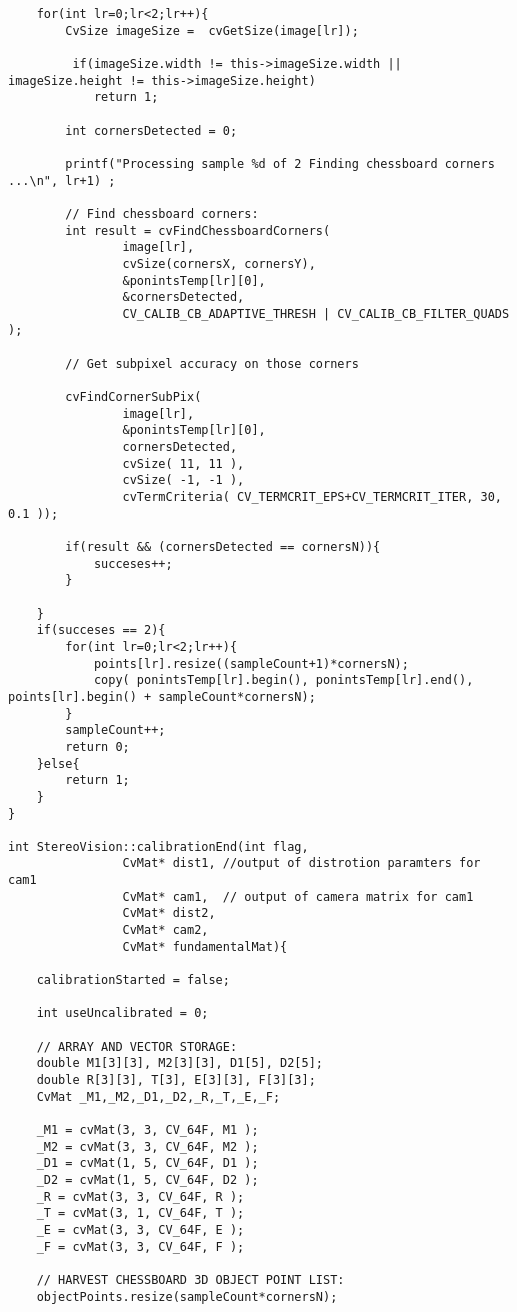 \begin{lstlisting}
    for(int lr=0;lr<2;lr++){
        CvSize imageSize =  cvGetSize(image[lr]);

         if(imageSize.width != this->imageSize.width || imageSize.height != this->imageSize.height)
            return 1;

        int cornersDetected = 0;

        printf("Processing sample %d of 2 Finding chessboard corners ...\n", lr+1) ;

		// Find chessboard corners:
		int result = cvFindChessboardCorners(
				image[lr],
				cvSize(cornersX, cornersY),
				&ponintsTemp[lr][0],
				&cornersDetected,
				CV_CALIB_CB_ADAPTIVE_THRESH | CV_CALIB_CB_FILTER_QUADS );

		// Get subpixel accuracy on those corners

		cvFindCornerSubPix(
				image[lr],
				&ponintsTemp[lr][0],
				cornersDetected,
				cvSize( 11, 11 ),
				cvSize( -1, -1 ),
				cvTermCriteria( CV_TERMCRIT_EPS+CV_TERMCRIT_ITER, 30, 0.1 ));

        if(result && (cornersDetected == cornersN)){
            succeses++;
        }

    }
    if(succeses == 2){
        for(int lr=0;lr<2;lr++){
            points[lr].resize((sampleCount+1)*cornersN);
            copy( ponintsTemp[lr].begin(), ponintsTemp[lr].end(),  points[lr].begin() + sampleCount*cornersN);
        }
        sampleCount++;
        return 0;
    }else{
        return 1;
    }
}

int StereoVision::calibrationEnd(int flag,
				CvMat* dist1, //output of distrotion paramters for cam1
				CvMat* cam1,  // output of camera matrix for cam1
				CvMat* dist2,
				CvMat* cam2,
				CvMat* fundamentalMat){

    calibrationStarted = false;

    int useUncalibrated = 0;

    // ARRAY AND VECTOR STORAGE:
    double M1[3][3], M2[3][3], D1[5], D2[5];
    double R[3][3], T[3], E[3][3], F[3][3];
    CvMat _M1,_M2,_D1,_D2,_R,_T,_E,_F;

    _M1 = cvMat(3, 3, CV_64F, M1 );
    _M2 = cvMat(3, 3, CV_64F, M2 );
    _D1 = cvMat(1, 5, CV_64F, D1 );
    _D2 = cvMat(1, 5, CV_64F, D2 );
    _R = cvMat(3, 3, CV_64F, R );
    _T = cvMat(3, 1, CV_64F, T );
    _E = cvMat(3, 3, CV_64F, E );
    _F = cvMat(3, 3, CV_64F, F );

    // HARVEST CHESSBOARD 3D OBJECT POINT LIST:
    objectPoints.resize(sampleCount*cornersN);


\end{lstlisting}
